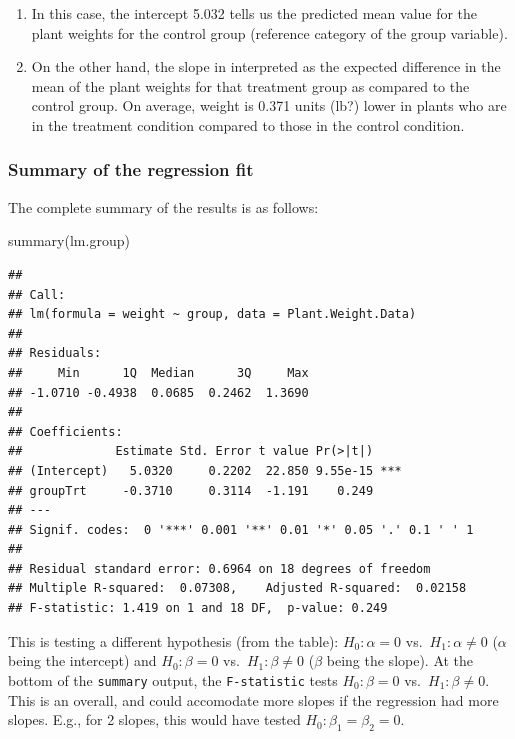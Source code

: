 \documentclass[
]{book}
\newenvironment{Shaded}{\begin{snugshade}}{\end{snugshade}}
\newcommand{\FunctionTok}[1]{\textcolor[rgb]{0.00,0.00,0.00}{#1}}
\newcommand{\NormalTok}[1]{#1}
\providecommand{\tightlist}{%
  \setlength{\itemsep}{0pt}\setlength{\parskip}{0pt}}
\begin{document}
\begin{enumerate}
\def\labelenumi{\arabic{enumi}.}
\tightlist
\item
  In this case, the intercept 5.032 tells us the predicted mean value for the plant weights for the control group (reference category of the group variable).
\item
  On the other hand, the slope in interpreted as the expected difference in the mean of the plant weights for that treatment group as compared to the control group. On average, weight is 0.371 units (lb?) lower in plants who are in the treatment condition compared to those in the control condition.
\end{enumerate}

\hypertarget{summary-of-the-regression-fit}{%
\subsubsection{Summary of the regression fit}\label{summary-of-the-regression-fit}}

The complete summary of the results is as follows:

\begin{Shaded}
\begin{Highlighting}[]
\FunctionTok{summary}\NormalTok{(lm.group)}
\end{Highlighting}
\end{Shaded}

\begin{verbatim}
## 
## Call:
## lm(formula = weight ~ group, data = Plant.Weight.Data)
## 
## Residuals:
##     Min      1Q  Median      3Q     Max 
## -1.0710 -0.4938  0.0685  0.2462  1.3690 
## 
## Coefficients:
##             Estimate Std. Error t value Pr(>|t|)    
## (Intercept)   5.0320     0.2202  22.850 9.55e-15 ***
## groupTrt     -0.3710     0.3114  -1.191    0.249    
## ---
## Signif. codes:  0 '***' 0.001 '**' 0.01 '*' 0.05 '.' 0.1 ' ' 1
## 
## Residual standard error: 0.6964 on 18 degrees of freedom
## Multiple R-squared:  0.07308,    Adjusted R-squared:  0.02158 
## F-statistic: 1.419 on 1 and 18 DF,  p-value: 0.249
\end{verbatim}

This is testing a different hypothesis (from the table): \(H_0: \alpha = 0\) vs.~\(H_1: \alpha \ne 0\) (\(\alpha\) being the intercept) and \(H_0: \beta = 0\) vs.~\(H_1: \beta \ne 0\) (\(\beta\) being the slope). At the bottom of the \texttt{summary} output, the \texttt{F-statistic} tests \(H_0: \beta = 0\) vs.~\(H_1: \beta \ne 0\). This is an overall, and could accomodate more slopes if the regression had more slopes. E.g., for 2 slopes, this would have tested \(H_0: \beta_1 = \beta_2 = 0\).
\end{document}
